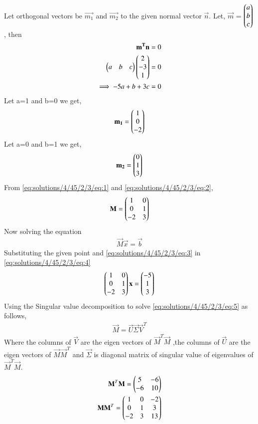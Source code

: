 Let orthogonal vectors be $\vec{m_1}$ and $\vec{m_2}$ to the given normal vector $\vec{n}$. Let, $\vec{m}$ = $\begin{pmatrix}a\\b\\c\end{pmatrix}$, then
\begin{align}
\mathbf{m^T}\mathbf{n} = 0\\
\begin{pmatrix}a&b&c\end{pmatrix}\begin{pmatrix}2\\-3\\1\end{pmatrix} = 0\\
\implies-5a+b+3c = 0
\end{align}
Let a=1 and b=0 we get,
\begin{align}
\mathbf{m_1} = \begin{pmatrix}1\\0\\-2\end{pmatrix} \label{eq:solutions/4/45/2/3/eq:1}
\end{align}
Let a=0 and b=1 we get,
\begin{align}
\mathbf{m_2} = \begin{pmatrix}0\\1\\3\end{pmatrix} \label{eq:solutions/4/45/2/3/eq:2}
\end{align}
From \eqref{eq:solutions/4/45/2/3/eq:1} and \eqref{eq:solutions/4/45/2/3/eq:2},
\begin{align}
\mathbf{M}= \begin{pmatrix}1&0\\0&1\\-2&3\end{pmatrix} \label{eq:solutions/4/45/2/3/eq:3}
\end{align}
Now solving the equation
\begin{align}
\vec{M}\vec{x} = \vec{b}\label{eq:solutions/4/45/2/3/eq:4}
\end{align}
Substituting the given point and \eqref{eq:solutions/4/45/2/3/eq:3} in \eqref{eq:solutions/4/45/2/3/eq:4}
\begin{align}
\begin{pmatrix}1&0\\0&1\\-2&3\end{pmatrix}\mathbf{x}=\begin{pmatrix}-5\\1\\3\end{pmatrix}\label{eq:solutions/4/45/2/3/eq:5}
\end{align}
Using the Singular value decomposition to solve \eqref{eq:solutions/4/45/2/3/eq:5} as follows,
\begin{align}
\vec{M}=\vec{U}\vec{\Sigma}\vec{V}^T\label{eq:solutions/4/45/2/3/eq:6}
\end{align}
Where the columns of $\vec{V}$ are the eigen vectors of $\vec{M}^T\vec{M}$ ,the columns of $\vec{U}$ are the eigen vectors of $\vec{M}\vec{M}^T$ and $\vec{\Sigma}$ is diagonal matrix of singular value of eigenvalues of $\vec{M}^T\vec{M}$.
\begin{align}
\mathbf{M}^T\mathbf{M}=\begin{pmatrix}5&-6\\-6&10\end{pmatrix}\label{eq:solutions/4/45/2/3/eq:7}\\
\mathbf{M}\mathbf{M}^T =\begin{pmatrix}1&0&-2\\0&1&3\\-2&3&13\end{pmatrix}
\end{align}
